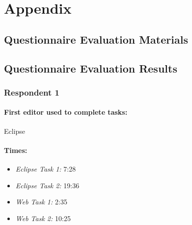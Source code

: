 \documentclass{report}
\begin{document}
\chapter{Appendix}
\section{Questionnaire Evaluation Materials}










\section{Questionnaire Evaluation Results}

\subsection{Respondent 1}
\subsubsection*{First editor used to complete tasks:} Eclipse
\subsubsection*{Times:}
\begin{itemize}
\item \emph{Eclipse Task 1:} 7:28
\item \emph{Eclipse Task 2:} 19:36
\item \emph{Web Task 1:} 2:35
\item \emph{Web Task 2:} 10:25
\end{itemize}
\end{document}
